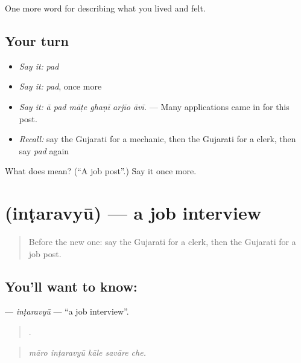 \begin{grammarlens}[title={What you've built}]
One more word for describing what you lived and felt.
\end{grammarlens}

\subsection*{Your turn}
\begin{itemize}
\raggedright
  \item \emph{Say it:} \emph{pad}
  \item \emph{Say it:} \emph{pad}, once more
  \item \emph{Say it:} \emph{ā pad māṭe ghaṇī arjīo āvī.} — Many applications came in for this post.
  \item \emph{Recall:} say the Gujarati for a mechanic, then the Gujarati for a clerk, then say \emph{pad} again
\end{itemize}

\begin{tcolorbox}[breakable,colback=teal!4,colframe=teal!35!black,title={Before you move on}]
What does  mean? (\textquotedblleft{}A job post\textquotedblright{}.) Say it once more.
\end{tcolorbox}
\section[\texorpdfstring{\gu{ઇન્ટરવ્યૂ} (inṭaravyū)}{ઇન્ટરવ્યૂ (inṭaravyū)}]{ (inṭaravyū) — a job interview}

\label{lesson:GU-C512-intaravyu}



\begin{quote}
Before the new one: say the Gujarati for a clerk, then the Gujarati for a job post.
\end{quote}

\subsection*{You'll want to know: }
\textbf{} — \emph{inṭaravyū} — \textquotedblleft{}a job interview\textquotedblright{}.

\begin{quote}
    .
\end{quote}

\begin{quote}
\emph{māro inṭaravyū kāle savāre che.}
\end{quote}


